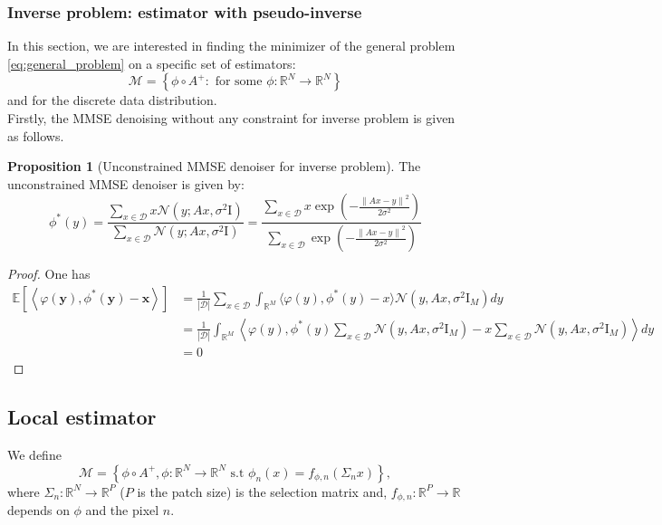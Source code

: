 \documentclass[a4paper,10pt]{article}
\theoremstyle{definition} %
\theoremstyle{definition} %
\newtheorem{proposition}[definition]{Proposition}
\theoremstyle{definition} %
\theoremstyle{definition} %
\newcommand{\R}{\mathbb{R}}
\newcommand{\E}[1]{\mathbb{E} \left[ {#1} \right] }
\newcommand{\Normal}[1]{\mathcal{N}\left( {#1} \right)}
\newcommand{\Id}{\mathrm{I}}
\newcommand{\norm}[1]{\left\| #1 \right \|}
\newcommand{\inner}[1]{\left\langle #1 \right\rangle}
\newcommand{\M}{\mathcal{M}}
\newcommand{\x}{\boldsymbol{x}}
\newcommand{\y}{\boldsymbol{y}}
\newcommand{\0}{\boldsymbol{0}}
\newcommand{\D}{\mathcal{D}}
\begin{document}
\subsubsection{Inverse problem: estimator with pseudo-inverse}
In this section, we are interested in finding the minimizer of the general problem \cref{eq:general_problem} on a specific set of estimators:
\begin{equation*}
    \M = \left\{ \phi \circ A^+: \mbox{ for some } \phi: \R^N \to \R^N \right\}
\end{equation*}
and for the discrete data distribution. 
\\Firstly, the MMSE denoising without any constraint for inverse problem is given as follows.
\begin{proposition}[Unconstrained MMSE denoiser for inverse problem]
    The unconstrained MMSE denoiser is given by:
    \begin{equation}
        \phi^{*}(y) =  \frac{\sum_{x \in \D} x \Normal{y; A x, \sigma^2 \Id}}{\sum_{x \in \D} \Normal{y; A x, \sigma^2 \Id}} =   \frac{\sum_{x \in \D} x \exp \left( -\frac{\norm{A x - y}^2}{2 \sigma^2} \right) }{\sum_{x \in \D}  \exp \left( -\frac{\norm{A x - y}^2}{2 \sigma^2} \right) }
    \end{equation}
\end{proposition}
\begin{proof}
    One has
    \begin{align*}
        \E{\inner{\varphi(\y), \phi^*(\y) - \x}} &=\frac{1}{|\D|}\sum_{x\in\D}\int_{\R^M} \langle \varphi(y), \phi^*(y)-x\rangle \Normal{y,Ax,\sigma^2 \Id_M} dy\\
        &= \frac{1}{|\D|}\int_{\R^M} \left\langle \varphi(y), \phi^*(y) \sum_{x\in\D}\Normal{y,Ax,\sigma^2 \Id_M}-x \sum_{x\in\D}\Normal{y,Ax,\sigma^2 \Id_M}\right\rangle dy\\
        &=0
    \end{align*} 
\end{proof}

\subsection{Local estimator}
We define 
\begin{equation}
    \M = \left\{\phi \circ A^+, \phi: \R^N \to \R^N \mbox{ s.t } \phi_n(x) = f_{\phi,n}(\Sigma_n x)\right\},
\end{equation}
where $\Sigma_n : \R^N \to \R^P$ ($P$ is the patch size) is the selection matrix and, $f_{\phi, n} : \R^P \to \R$ depends on $\phi$ and the pixel $n$.
\end{document}
